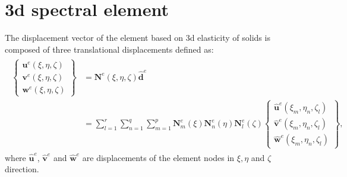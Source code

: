 \section{\acs{3d} spectral element}
\label{sec:3Dmodel}

The displacement vector of the element based on \ac{3d} elasticity of solids is composed of three translational displacements defined as:
\begin{eqnarray}
	\begin{split}
	\left \{ \begin{array}{c}
		\textbf{u}^e(\xi,\eta,\zeta) \\
		\textbf{v}^e(\xi,\eta,\zeta) \\
		\textbf{w}^e(\xi,\eta,\zeta)
	\end{array} \right\}
	& = \textbf{N}^e(\xi,\eta, \zeta)\widehat{\textbf{d}}^e\\
	& = \sum_{l=1}^r\sum_{n=1}^q\sum_{m=1}^p\textbf{N}_m^e(\xi)\textbf{N}_n^e(\eta)\textbf{N}_l^e(\zeta)
	\left \{ \begin{array}{c}
		\widehat{\textbf{u}}^e(\xi_m,\eta_n,\zeta_l) \\
		\widehat{\textbf{v}}^e(\xi_m,\eta_n,\zeta_l) \\
		\widehat{\textbf{w}}^e(\xi_m,\eta_n,\zeta_l)
	\end{array} \right\},
	\label{eq:3D_displ}
	\end{split}
\end{eqnarray}
where \(\widehat{\textbf{u}}^e\), \(\widehat{\textbf{v}}^e\) and 
\(\widehat{\textbf{w}}^e\) are displacements of the element nodes in \(\xi,\eta\) and \(\zeta\) direction.

